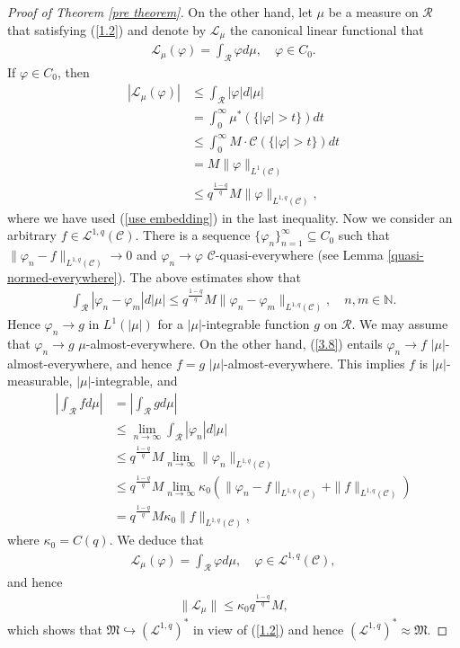 \documentclass[10pt,reqno]{amsart}
\numberwithin{equation}{section}
\begin{document}
\begin{proof}[Proof of Theorem \ref{pre theorem}]
On the other hand, let $\mu$ be a measure on $\mathcal{R}$ that satisfying (\ref{1.2}) and denote by $\mathcal{L}_{\mu}$ the canonical linear functional that 
\begin{align*}
\mathcal{L}_{\mu}(\varphi)=\int_{\mathcal{R}}\varphi d\mu,\quad\varphi\in C_{0}. 
\end{align*}
If $\varphi\in C_{0}$, then 
\begin{align*}
|\mathcal{L}_{\mu}(\varphi)|&\leq\int_{\mathcal{R}}|\varphi|d|\mu|\\
&=\int_{0}^{\infty}\mu^{\ast}(\{|\varphi|>t\})dt\\
&\leq\int_{0}^{\infty}M\cdot\mathcal{C}(\{|\varphi|>t\})dt\\
&=M\|\varphi\|_{L^{1}(\mathcal{C})}\\
&\leq q^{\frac{1-q}{q}}M\|\varphi\|_{L^{1,q}(\mathcal{C})},
\end{align*}
where we have used (\ref{use embedding}) in the last inequality. Now we consider an arbitrary $f\in\mathcal{L}^{1,q}(\mathcal{C})$. There is a sequence $\{\varphi_{n}\}_{n=1}^{\infty}\subseteq C_{0}$ such that $\|\varphi_{n}-f\|_{L^{1,q}(\mathcal{C})}\rightarrow 0$ and $\varphi_{n}\rightarrow\varphi$ $\mathcal{C}$-quasi-everywhere (see Lemma \ref{quasi-normed-everywhere}). The above estimates show that
\begin{align*}
\int_{\mathcal{R}}|\varphi_{n}-\varphi_{m}|d|\mu|\leq q^{\frac{1-q}{q}}M\|\varphi_{n}-\varphi_{m}\|_{L^{1,q}(\mathcal{C})},\quad n,m\in\mathbb{N}.
\end{align*}
Hence $\varphi_{n}\rightarrow g$ in $L^{1}(|\mu|)$ for a $|\mu|$-integrable function $g$ on $\mathcal{R}$. We may assume that $\varphi_{n}\rightarrow g$ $\mu$-almost-everywhere. On the other hand, (\ref{3.8}) entails $\varphi_{n}\rightarrow f$ $|\mu|$-almost-everywhere, and hence $f=g$ $|\mu|$-almost-everywhere. This implies $f$ is $|\mu|$-measurable, $|\mu|$-integrable, and 
\begin{align*}
\left|\int_{\mathcal{R}}f d\mu\right|&=\left|\int_{\mathcal{R}}g d\mu\right|\\
&\leq\lim_{n\rightarrow\infty}\int_{\mathcal{R}}|\varphi_{n}| d|\mu|\\
&\leq q^{\frac{1-q}{q}}M\lim_{n\rightarrow\infty}\|\varphi_{n}\|_{L^{1,q}(\mathcal{C})}\\
&\leq q^{\frac{1-q}{q}}M\lim_{n\rightarrow\infty}\kappa_{0}(\|\varphi_{n}-f\|_{L^{1,q}(\mathcal{C})}+\|f\|_{L^{1,q}(\mathcal{C})})\\
&=q^{\frac{1-q}{q}}M\kappa_{0}\|f\|_{L^{1,q}(\mathcal{C})},
\end{align*}
where $\kappa_{0}=C(q)$. We deduce that
\begin{align*}
\mathcal{L}_{\mu}(\varphi)=\int_{\mathcal{R}}\varphi d\mu,\quad\varphi\in\mathcal{L}^{1,q}(\mathcal{C}),
\end{align*} 
and hence
\begin{align}\label{last}
\|\mathcal{L}_{\mu}\|\leq\kappa_{0}q^{\frac{1-q}{q}}M,
\end{align}
which shows that $\mathfrak{M}\hookrightarrow(\mathcal{L}^{1,q})^{\ast}$ in view of (\ref{1.2}) and hence $(\mathcal{L}^{1,q})^{\ast}\approx\mathfrak{M}$.


\end{proof}
\end{document}
